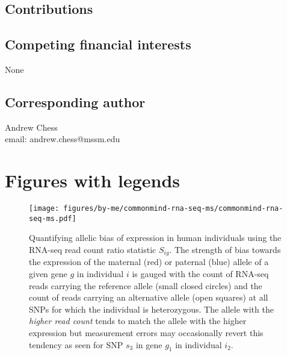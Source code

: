 \documentclass[letterpaper]{article}
\begin{document}
\subsection{Contributions}

\subsection{Competing financial interests}

None

\subsection{Corresponding author}

Andrew Chess\\
email: andrew.chess@mssm.edu

\clearpage

\section{Figures with legends}

\begin{figure}[H]
\begin{center}
\texttt{[image: figures/by-me/commonmind-rna-seq-ms/commonmind-rna-seq-ms.pdf]}
\end{center}
\caption{Quantifying allelic bias of expression in human
individuals using the RNA-seq read count ratio statistic \(S_{ig}\).
The strength of
bias towards the expression of the maternal (red) or paternal (blue) allele of
a given gene \(g\) in individual \(i\) is gauged with the count of RNA-seq
reads carrying the reference allele (small closed circles) and the count of
reads carrying an alternative allele (open squares) at all SNPs for which the
individual is heterozygous.  The allele with the \emph{higher read count} tends to
match the allele with the higher expression but measurement errors may
occasionally revert this tendency as seen for SNP \(s_3\) in gene \(g_1\) in
individual \(i_2\).  }
\label{fig:study-design}
\end{figure}
\end{document}
